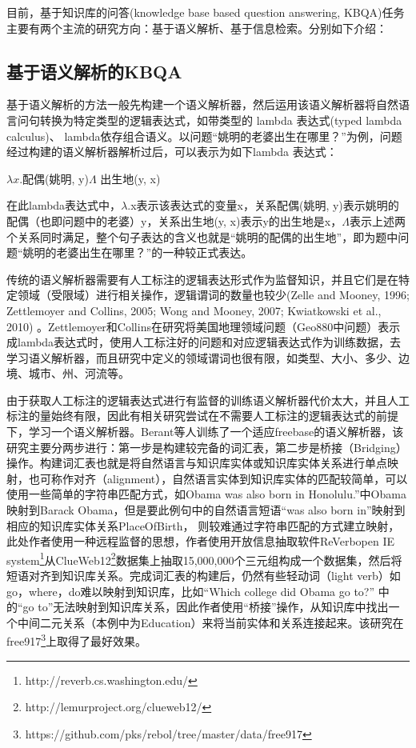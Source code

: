 目前，基于知识库的问答(knowledge base based question answering, KBQA)任务主要有两个主流的研究方向：基于语义解析、基于信息检索。分别如下介绍：

\subsection{基于语义解析的KBQA}
基于语义解析的方法一般先构建一个语义解析器，然后运用该语义解析器将自然语言问句转换为特定类型的逻辑表达式，如带类型的 lambda 表达式(typed lambda calculus)、 lambda依存组合语义。以问题“姚明的老婆出生在哪里？”为例，问题经过构建的语义解析器解析过后，可以表示为如下lambda 表达式：
\begin{center}
$\lambda x.$配偶(姚明, y)\space$\Lambda$ 出生地(y, x)
\end{center}

在此lambda表达式中，$\lambda$.x表示该表达式的变量x，关系配偶(姚明, y)表示姚明的配偶（也即问题中的老婆）y，关系出生地(y, x)表示y的出生地是x，$\Lambda$表示上述两个关系同时满足，整个句子表达的含义也就是“姚明的配偶的出生地”，即为题中问题“姚明的老婆出生在哪里？”的一种较正式表达。

传统的语义解析器需要有人工标注的逻辑表达形式作为监督知识，并且它们是在特定领域（受限域）进行相关操作，逻辑谓词的数量也较少\cite{Zettlemoyer}\cite{Wong}\cite{Kwiatkowski}(Zelle and Mooney, 1996; Zettlemoyer and Collins, 2005; Wong and Mooney, 2007;
Kwiatkowski et al., 2010) 。Zettlemoyer和Collins在研究将美国地理领域问题（Geo880中问题）表示成lambda表达式时，使用人工标注好的问题和对应逻辑表达式作为训练数据，去学习语义解析器，而且研究中定义的领域谓词也很有限，如类型、大小、多少、边境、城市、州、河流等。

由于获取人工标注的逻辑表达式进行有监督的训练语义解析器代价太大，并且人工标注的量始终有限，因此有相关研究尝试在不需要人工标注的逻辑表达式的前提下，学习一个语义解析器。Berant\cite{BerantCF}等人训练了一个适应freebase的语义解析器，该研究主要分两步进行：第一步是构建较完备的词汇表，第二步是桥接（Bridging）操作。构建词汇表也就是将自然语言与知识库实体或知识库实体关系进行单点映射，也可称作对齐（alignment），自然语言实体到知识库实体的匹配较简单，可以使用一些简单的字符串匹配方式，如Obama was also born in Honolulu.”中Obama映射到Barack Obama，但是要此例句中的自然语言短语“was also born in”映射到相应的知识库实体关系PlaceOfBirth， 则较难通过字符串匹配的方式建立映射，此处作者使用一种远程监督的思想，作者使用开放信息抽取软件ReVerbopen IE system\footnote{http://reverb.cs.washington.edu/}从ClueWeb12\footnote{http://lemurproject.org/clueweb12/}数据集上抽取15,000,000个三元组构成一个数据集，然后将短语对齐到知识库关系。完成词汇表的构建后，仍然有些轻动词（light verb）如go，where，do难以映射到知识库，比如“Which college did Obama go to?” 中的“go to”无法映射到知识库关系，因此作者使用“桥接”操作，从知识库中找出一个中间二元关系（本例中为Education）来将当前实体和关系连接起来。该研究在free917\footnote{https://github.com/pks/rebol/tree/master/data/free917}上取得了最好效果。

